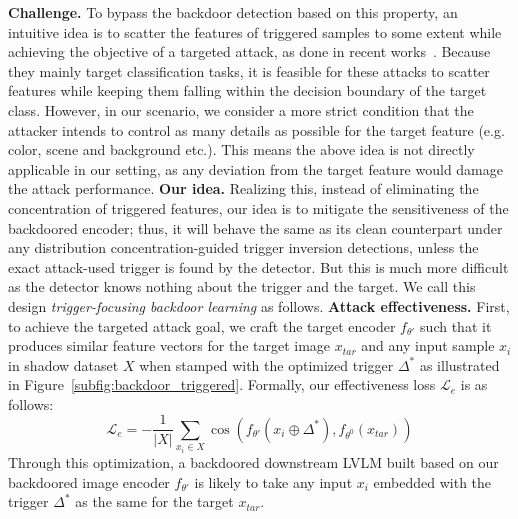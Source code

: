 \textbf{Challenge.} To bypass the backdoor detection based on this property, an intuitive idea is to scatter the features of triggered samples to some extent while achieving the objective of a targeted attack, as done in recent works~\cite{doan2021backdoor, tao2023distribution}. Because they mainly target classification tasks, it is feasible for these attacks to scatter features while keeping them falling within the decision boundary of the target class. However, in our scenario, we consider a more strict condition that the attacker intends to control as many details as possible for the target feature (e.g. color, scene and background 
etc.). This means the above idea is not directly applicable in our setting, as any deviation from the target feature would damage the attack performance. 
\newline \indent
\textbf{Our idea.} Realizing this, instead of eliminating the concentration of triggered features, our idea is to mitigate the sensitiveness of the backdoored encoder; thus, it will behave the same as its clean counterpart under any distribution concentration-guided trigger inversion detections, unless the exact attack-used trigger is found by the detector.
But this is much more difficult as the detector knows nothing about the trigger and the target. We call this design \emph{trigger-focusing backdoor learning} as follows. 
\newline \indent
\textbf{Attack effectiveness.} First, to achieve the targeted attack goal, we craft the target encoder $f_{\theta'}$ such that it produces similar feature vectors for the target image $x_{tar}$ and any input sample $x_{i}$ in shadow dataset $X$ when stamped with the optimized trigger $\varDelta^*$ as illustrated in Figure~\ref{subfig:backdoor_triggered}. Formally, our effectiveness loss $\mathcal{L}_{e}$ is as follows:
\begin{equation}
    \mathcal{L}_{e} = -\frac{1}{\left| X \right|} \sum_{x_i \in X} \cos\left( f_{\theta'}\left( x_i \oplus \varDelta^* \right), f_{\theta^0}\left( x_{tar} \right) \right) \label{eq:effective_loss}
\end{equation}
Through this optimization, a backdoored downstream LVLM built based on our backdoored image encoder $f_{\theta'}$ is likely to take any input $x_{i}$ embedded with the trigger $\varDelta^*$ as the same for the target $x_{tar}$. 

